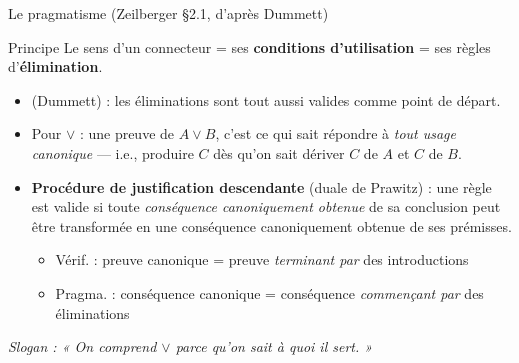 \documentclass[aspectratio=169]{beamer}
\begin{document}
\begin{frame}{Le pragmatisme (Zeilberger §2.1, d'après Dummett)}
  \begin{block}{Principe}
    Le sens d'un connecteur = ses \textbf{conditions d'utilisation} = ses règles d'\textbf{élimination}.
  \end{block}
  \begin{itemize}
    \item (Dummett) : les éliminations sont tout aussi valides comme point de départ.
      \pause
    \item Pour $\vee$ : une preuve de $A \vee B$, c'est ce qui sait répondre à
      \emph{tout usage canonique} — i.e., produire $C$ dès qu'on sait dériver
      $C$ de $A$ et $C$ de $B$.
      \pause
    \item \textbf{Procédure de justification descendante} (duale de Prawitz) :
      une règle est valide si toute \emph{conséquence canoniquement obtenue}
      de sa conclusion peut être transformée en une conséquence canoniquement
      obtenue de ses prémisses.
      \begin{itemize}
        \item[$\uparrow$] Vérif. : preuve canonique = preuve \emph{terminant par} des introductions
        \item[$\downarrow$] Pragma. : conséquence canonique = conséquence \emph{commençant par} des éliminations
      \end{itemize}
  \end{itemize}
  \medskip
  \textit{Slogan : « On comprend $\vee$ parce qu'on sait à quoi il sert. »}
\end{frame}
\end{document}
